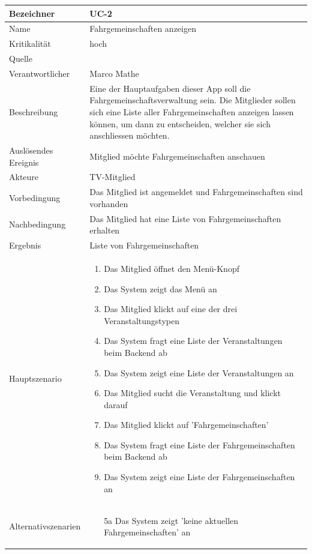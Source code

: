 \begin{table}[ht]
\centering
  \begin{tabular}{ l | p{10cm} }
	\hline
	\rowcolor{gray}
	Bezeichner		&	UC-2\\ \hline
	Name			&	Fahrgemeinschaften anzeigen\\ \hline
	Kritikalität		&	hoch\\ \hline
	Quelle			&	\glossarmark{Stakeholder}\\ \hline
	Verantwortlicher	&	Marco Mathe\\ \hline
	Beschreibung	&	Eine der Hauptaufgaben dieser App soll die Fahrgemeinschaftsverwaltung sein. Die Mitglieder sollen sich eine Liste aller Fahrgemeinschaften anzeigen lassen können, um dann zu entscheiden, welcher sie sich anschliessen möchten.\\ \hline
	Auslösendes Ereignis&	Mitglied möchte Fahrgemeinschaften anschauen\\ \hline
	Akteure		&	TV-Mitglied\\ \hline
	Vorbedingung	&	Das Mitglied ist angemeldet und Fahrgemeinschaften sind vorhanden\\ \hline
	Nachbedingung	&	Das Mitglied hat eine Liste von Fahrgemeinschaften erhalten\\ \hline
	Ergebnis		&	Liste von Fahrgemeinschaften\\ \hline
	Hauptszenario	&	\begin{enumerate}
					\item Das Mitglied öffnet den Menü-Knopf
					\item Das System zeigt das Menü an
					\item Das Mitglied klickt auf eine der drei Veranstaltungstypen
					\item Das System fragt eine Liste der Veranstaltungen beim Backend ab
					\item Das System zeigt eine Liste der Veranstaltungen an
					\item Das Mitglied sucht die Veranstaltung und klickt darauf
					\item Das Mitglied klickt auf 'Fahrgemeinschaften'
					\item Das System fragt eine Liste der Fahrgemeinschaften beim Backend ab
					\item Das System zeigt eine Liste der Fahrgemeinschaften an
					\end{enumerate}
					\\ \hline
	Alternativszenarien	&	\begin{enumerate}
					\item[5a] Das System zeigt 'keine aktuellen Fahrgemeinschaften' an

\end{enumerate}
\end{tabular}
\end{table}
